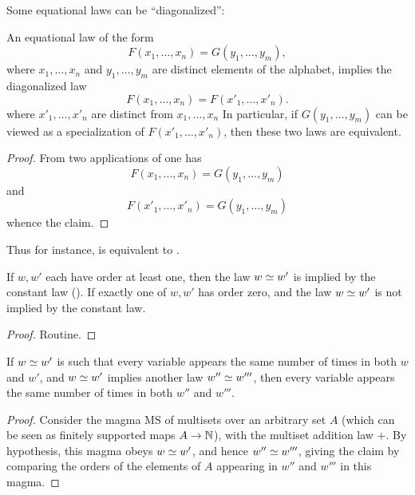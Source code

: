 Some equational laws can be ``diagonalized'':

\begin{theorem}[Diagonalization]\label{diag}
  An equational law of the form
  \begin{equation}\label{prediag}
    F(x_1,\dots,x_n) = G(y_1,\dots,y_m),
  \end{equation}
  where $x_1,\dots,x_n$ and $y_1,\dots,y_m$ are distinct elements of the alphabet, implies the diagonalized law
  $$ F(x_1,\dots,x_n) = F(x'_1,\dots,x'_n).$$
  where $x'_1,\dots,x'_n$ are distinct from $x_1,\dots,x_n$
  In particular, if $G(y_1,\dots,y_m)$ can be viewed as a specialization of $F(x'_1,\dots,x'_n)$, then these two laws are equivalent.
\end{theorem}

\begin{proof}
  From two applications of  one has
  $$ F(x_1,\dots,x_n) = G(y_1,\dots,y_m)$$
  and
  $$ F(x'_1,\dots,x'_n) = G(y_1,\dots,y_m)$$
  whence the claim.
\end{proof}

Thus for instance,  is equivalent to .

\begin{theorem}\label{constant-impl}
  If $w, w'$ each have order at least one, then the law $w \simeq w'$ is implied by the constant law (). If exactly one of $w, w'$ has order zero, and the law $w \simeq w'$ is not implied by the constant law.
\end{theorem}

\begin{proof}
  Routine.
\end{proof}

\begin{theorem}\label{variable-impl}\leanok
  If $w \simeq w'$ is such that every variable appears the same number of times in both $w$ and $w'$, and $w \simeq w'$ implies another law $w'' \simeq w'''$, then every variable appears the same number of times in both $w''$ and $w'''$.
\end{theorem}

\begin{proof}
  Consider the magma $\mathrm{MS}$ of multisets over an arbitrary set $A$ (which can be seen as finitely supported maps $A\rightarrow \mathbb{N}$), with the multiset addition law $+$. By hypothesis, this magma obeys $w \simeq w'$, and hence $w'' \simeq w'''$, giving the claim by comparing the orders of the elements of $A$ appearing in $w''$ and $w'''$ in this magma.
\end{proof}

